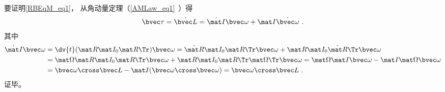 要证明\autoref{RBEqM_eq1}， 从角动量定理（\autoref{AMLaw_eq1}~）得
\begin{equation}\label{RBEqM_eq3}
\bvec \tau = \dot{\bvec L} = \dot{\mat I} \bvec\omega + \mat I \dot{\bvec\omega}~.
\end{equation}
其中
\begin{equation}
\begin{aligned}
\dot{\mat I}\bvec\omega &= \dv{t}(\mat R \mat I_0 \mat R\Tr)\bvec\omega
= \dot{\mat R} \mat I_0 \mat R\Tr \bvec\omega + \mat R \mat I_0 \dot{\mat R}\Tr \bvec\omega\\
&= \mat \Omega \mat R \mat I_0 \mat R\Tr \bvec\omega + \mat R \mat I_0 \mat R\Tr \mat \Omega\Tr \bvec\omega
= \mat \Omega \mat I \bvec\omega - \mat I \mat \Omega \bvec\omega\\
&= \bvec \omega \cross \bvec L - \mat I (\bvec\omega\cross\bvec\omega)
= \bvec \omega \cross \bvec L~.
\end{aligned}
\end{equation}
证毕。


